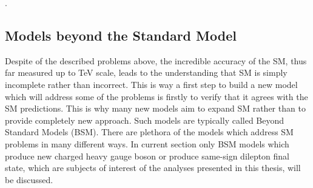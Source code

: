 .


\subsection{Models beyond the Standard Model}
\label{subsec:bsm_models}
Despite of the described problems above, the incredible accuracy of the SM, thus far measured up to TeV scale, leads to the understanding that SM 
is simply incomplete rather than incorrect. 
This is way a first step to build a new model which will address some of the problems is firstly to verify that it agrees with the SM predictions. 
This is why many new models aim to expand SM rather than to provide completely new approach. Such models are typically called Beyond Standard Models (BSM).
There are plethora of the models which address SM problems in many different ways. In current section only BSM models which produce new charged heavy gauge boson or produce same-sign dilepton final state, which are subjects of interest of the analyses presented in this thesis, will be discussed.

